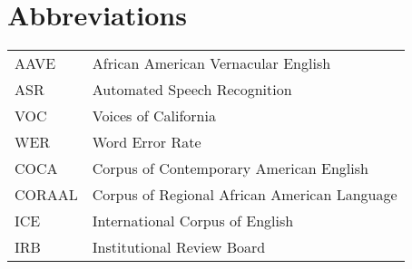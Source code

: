 \documentclass[output=paper,colorlinks,citecolor=brown]{langscibook}
\begin{document}
\section*{Abbreviations}
\begin{tabularx}{\textwidth}{@{}lQ@{}}
\textsc{AAVE} & African American Vernacular English  \\
\textsc {ASR}& Automated Speech Recognition \\
\textsc {VOC} & Voices of California \\
\textsc {WER} & Word Error Rate   \\
\textsc {COCA}& Corpus of Contemporary American English\\
\textsc{CORAAL} & Corpus of Regional African American Language\\
\textsc{ICE} & International Corpus of English\\
\textsc {IRB} & Institutional Review Board\\
\end{tabularx}

\largerpage
\printbibliography[heading=subbibliography,notkeyword=this]
\end{document}
